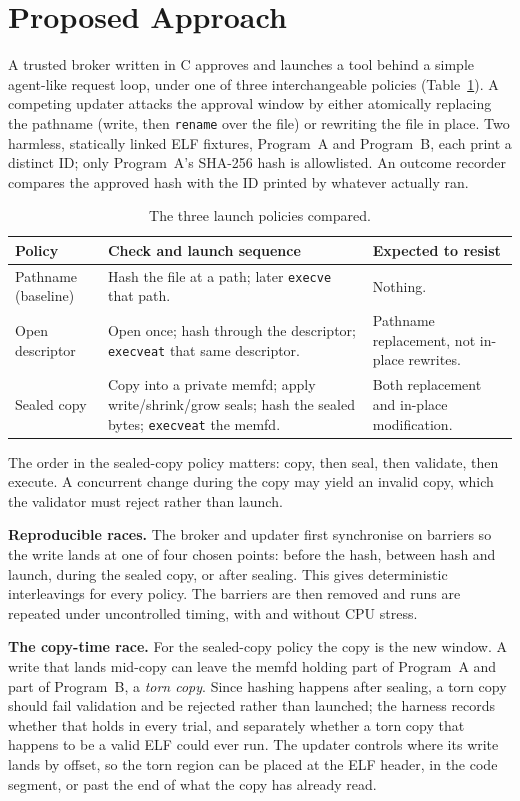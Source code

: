 \documentclass[11pt,a4paper]{article}
\begin{document}
\section{Proposed Approach}
A trusted broker written in C approves and launches a tool behind a simple agent-like request loop, under one of three interchangeable policies (Table~\ref{tab:policies}). A competing updater attacks the approval window by either atomically replacing the pathname (write, then \texttt{rename} over the file) or rewriting the file in place. Two harmless, statically linked ELF fixtures, Program~A and Program~B, each print a distinct ID; only Program~A's SHA-256 hash is allowlisted. An outcome recorder compares the approved hash with the ID printed by whatever actually ran.

\begin{table}[h]
\centering
\small
\begin{tabular}{p{2.6cm} p{6.6cm} p{5.2cm}}
\toprule
\textbf{Policy} & \textbf{Check and launch sequence} & \textbf{Expected to resist} \\
\midrule
Pathname (baseline) & Hash the file at a path; later \texttt{execve} that path. & Nothing. \\
Open descriptor & Open once; hash through the descriptor; \texttt{execveat} that same descriptor. & Pathname replacement, not in-place rewrites. \\
Sealed copy & Copy into a private memfd; apply write/shrink/grow seals; hash the sealed bytes; \texttt{execveat} the memfd. & Both replacement and in-place modification. \\
\bottomrule
\end{tabular}
\caption{The three launch policies compared.}
\label{tab:policies}
\end{table}

The order in the sealed-copy policy matters: copy, then seal, then validate, then execute. A concurrent change during the copy may yield an invalid copy, which the validator must reject rather than launch.

\textbf{Reproducible races.} The broker and updater first synchronise on barriers so the write lands at one of four chosen points: before the hash, between hash and launch, during the sealed copy, or after sealing. This gives deterministic interleavings for every policy. The barriers are then removed and runs are repeated under uncontrolled timing, with and without CPU stress.

\textbf{The copy-time race.} For the sealed-copy policy the copy is the new window. A write that lands mid-copy can leave the memfd holding part of Program~A and part of Program~B, a \emph{torn copy}. Since hashing happens after sealing, a torn copy should fail validation and be rejected rather than launched; the harness records whether that holds in every trial, and separately whether a torn copy that happens to be a valid ELF could ever run. The updater controls where its write lands by offset, so the torn region can be placed at the ELF header, in the code segment, or past the end of what the copy has already read.
\end{document}
